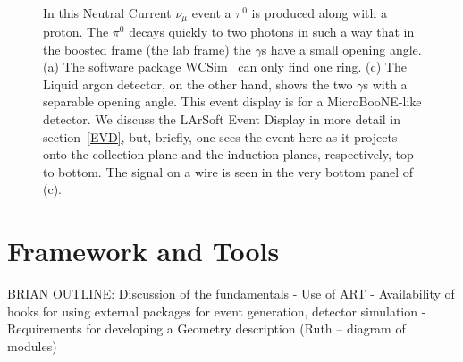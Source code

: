 \documentclass[12pt]{elsarticle}
\begin{document}
\hspace*{2cm}
\begin{figure}[h]
\centering
\caption{In this Neutral Current $\nu_\mu$ event a $\pi^0$ is produced along with a proton. The $\pi^0$ decays quickly to two photons in such a way that in the boosted frame (the lab frame) the $\gamma$s have a small opening angle. (a) The software package WCSim~\cite{wcsim} can only find one ring. (c) The Liquid argon detector, on the other hand, shows the two $\gamma$s with a separable opening angle. This event display is for a MicroBooNE-like detector. We discuss the LArSoft Event Display in more detail in section~\ref{EVD}, but, briefly, one sees the event here as it projects onto the collection plane and the induction planes, respectively, top to bottom. The signal on a wire is seen in the very bottom panel of (c). }
\\
%
\label{pi0.overlap}
\end{figure}


\section{Framework and Tools}

BRIAN OUTLINE: Discussion of the fundamentals
- Use of ART
- Availability of hooks for using external packages for event generation, detector simulation
- Requirements for developing a Geometry description
(Ruth -- diagram of modules)
\end{document}
